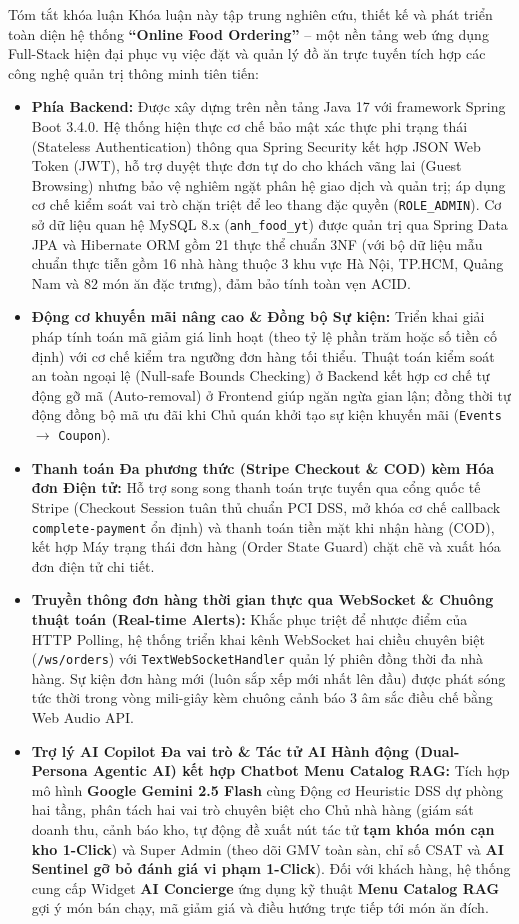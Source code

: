 \documentclass{uetgraduation}
\begin{document}
\begin{preamble}{Tóm tắt khóa luận}
Khóa luận này tập trung nghiên cứu, thiết kế và phát triển toàn diện hệ thống \textbf{``Online Food Ordering''} -- một nền tảng web ứng dụng Full-Stack hiện đại phục vụ việc đặt và quản lý đồ ăn trực tuyến tích hợp các công nghệ quản trị thông minh tiên tiến:
\begin{itemize}
    \item \textbf{Phía Backend:} Được xây dựng trên nền tảng Java 17 với framework Spring Boot 3.4.0. Hệ thống hiện thực cơ chế bảo mật xác thực phi trạng thái (Stateless Authentication) thông qua Spring Security kết hợp JSON Web Token (JWT), hỗ trợ duyệt thực đơn tự do cho khách vãng lai (Guest Browsing) nhưng bảo vệ nghiêm ngặt phân hệ giao dịch và quản trị; áp dụng cơ chế kiểm soát vai trò chặn triệt để leo thang đặc quyền (\texttt{ROLE\_ADMIN}). Cơ sở dữ liệu quan hệ MySQL 8.x (\texttt{anh\_food\_yt}) được quản trị qua Spring Data JPA và Hibernate ORM gồm 21 thực thể chuẩn 3NF (với bộ dữ liệu mẫu chuẩn thực tiễn gồm 16 nhà hàng thuộc 3 khu vực Hà Nội, TP.HCM, Quảng Nam và 82 món ăn đặc trưng), đảm bảo tính toàn vẹn ACID.
    \item \textbf{Động cơ khuyến mãi nâng cao \& Đồng bộ Sự kiện:} Triển khai giải pháp tính toán mã giảm giá linh hoạt (theo tỷ lệ phần trăm hoặc số tiền cố định) với cơ chế kiểm tra ngưỡng đơn hàng tối thiểu. Thuật toán kiểm soát an toàn ngoại lệ (Null-safe Bounds Checking) ở Backend kết hợp cơ chế tự động gỡ mã (Auto-removal) ở Frontend giúp ngăn ngừa gian lận; đồng thời tự động đồng bộ mã ưu đãi khi Chủ quán khởi tạo sự kiện khuyến mãi (\texttt{Events} $\to$ \texttt{Coupon}).
    \item \textbf{Thanh toán Đa phương thức (Stripe Checkout \& COD) kèm Hóa đơn Điện tử:} Hỗ trợ song song thanh toán trực tuyến qua cổng quốc tế Stripe (Checkout Session tuân thủ chuẩn PCI DSS, mở khóa cơ chế callback \texttt{complete-payment} ổn định) và thanh toán tiền mặt khi nhận hàng (COD), kết hợp Máy trạng thái đơn hàng (Order State Guard) chặt chẽ và xuất hóa đơn điện tử chi tiết.
    \item \textbf{Truyền thông đơn hàng thời gian thực qua WebSocket \& Chuông thuật toán (Real-time Alerts):} Khắc phục triệt để nhược điểm của HTTP Polling, hệ thống triển khai kênh WebSocket hai chiều chuyên biệt (\texttt{/ws/orders}) với \texttt{TextWebSocketHandler} quản lý phiên đồng thời đa nhà hàng. Sự kiện đơn hàng mới (luôn sắp xếp mới nhất lên đầu) được phát sóng tức thời trong vòng mili-giây kèm chuông cảnh báo 3 âm sắc điều chế bằng Web Audio API.
    \item \textbf{Trợ lý AI Copilot Đa vai trò \& Tác tử AI Hành động (Dual-Persona Agentic AI) kết hợp Chatbot Menu Catalog RAG:} Tích hợp mô hình \textbf{Google Gemini 2.5 Flash} cùng Động cơ Heuristic DSS dự phòng hai tầng, phân tách hai vai trò chuyên biệt cho Chủ nhà hàng (giám sát doanh thu, cảnh báo kho, tự động đề xuất nút tác tử \textbf{tạm khóa món cạn kho 1-Click}) và Super Admin (theo dõi GMV toàn sàn, chỉ số CSAT và \textbf{AI Sentinel gỡ bỏ đánh giá vi phạm 1-Click}). Đối với khách hàng, hệ thống cung cấp Widget \textbf{AI Concierge} ứng dụng kỹ thuật \textbf{Menu Catalog RAG} gợi ý món bán chạy, mã giảm giá và điều hướng trực tiếp tới món ăn đích.

\end{itemize}
\end{preamble}
\end{document}
